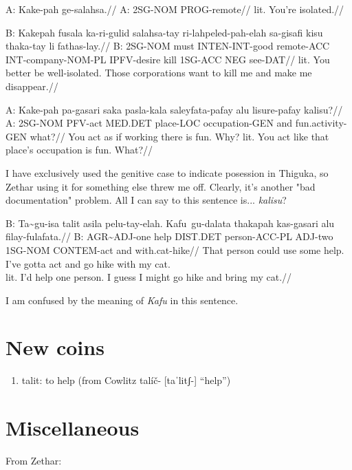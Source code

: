 \documentclass{thiguka}
\begin{document}
\ex
\begingl
\gla A: Kake-pah ge-salahsa.//
\glb A: 2SG-NOM PROG-remote//
\glft lit. You're isolated.//
\endgl
\xe

\ex
\begingl
\gla B: Kakepah fusala ka-ri-gulid salahsa-tay ri-lahpeled-pah-elah sa-gisafi kisu thaka-tay li fathas-lay.//
\glb B: 2SG-NOM must INTEN-INT-good remote-ACC INT-company-NOM-PL IPFV-desire kill 1SG-ACC NEG see-DAT//
\glft lit. You better be well-isolated. Those corporations want to kill me and make me disappear.//
\endgl
\xe

\ex
\begingl
\gla A: Kake-pah pa-gasari saka pasla-kala saleyfata-pafay alu lisure-pafay kalisu?//
\glb A: 2SG-NOM PFV-act MED.DET place-LOC occupation-GEN and fun.activity-GEN what?//
\glft You act as if working there is fun. Why?
      lit. You act like that place's occupation is fun. What?//
\endgl
\xe

I have exclusively used the genitive case to indicate posession in Thiguka, so Zethar using it for something else threw me off.
Clearly, it's another "bad documentation" problem.
All I can say to this sentence is... \textit{kalisu}?

\ex
\begingl
\gla B: Ta\~{}gu-isa talit asila pelu-tay-elah. Kafu~gu-dalata thakapah kas-gasari alu filay-fulafata.//
\glb B: AGR\~{}ADJ-one help DIST.DET person-ACC-PL ADJ-two 1SG-NOM CONTEM-act and with.cat-hike//
\glft That person could use some help. I've gotta act and go hike with my cat.\\
      lit. I'd help one person. I guess I might go hike and bring my cat.//
\endgl
\xe

I am confused by the meaning of \textit{Kafu} in this sentence.



\section{New coins}
\begin{enumerate}
    \item talit: to help (from Cowlitz talíč- [taˈlitʃ-] “help”)
\end{enumerate}

\section{Miscellaneous}

From Zethar:
\end{document}
